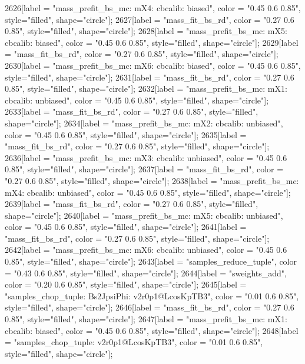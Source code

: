 {	2626[label = "mass_prefit_bs_mc\nmassbin: mX4\nmassmodel: cbcalib\ntrigger: biased", color = "0.45 0.6 0.85", style="filled", shape="circle"];
	2627[label = "mass_fit_bs_rd", color = "0.27 0.6 0.85", style="filled", shape="circle"];
	2628[label = "mass_prefit_bs_mc\nmassbin: mX5\nmassmodel: cbcalib\ntrigger: biased", color = "0.45 0.6 0.85", style="filled", shape="circle"];
	2629[label = "mass_fit_bs_rd", color = "0.27 0.6 0.85", style="filled", shape="circle"];
	2630[label = "mass_prefit_bs_mc\nmassbin: mX6\nmassmodel: cbcalib\ntrigger: biased", color = "0.45 0.6 0.85", style="filled", shape="circle"];
	2631[label = "mass_fit_bs_rd", color = "0.27 0.6 0.85", style="filled", shape="circle"];
	2632[label = "mass_prefit_bs_mc\nmassbin: mX1\nmassmodel: cbcalib\ntrigger: unbiased", color = "0.45 0.6 0.85", style="filled", shape="circle"];
	2633[label = "mass_fit_bs_rd", color = "0.27 0.6 0.85", style="filled", shape="circle"];
	2634[label = "mass_prefit_bs_mc\nmassbin: mX2\nmassmodel: cbcalib\ntrigger: unbiased", color = "0.45 0.6 0.85", style="filled", shape="circle"];
	2635[label = "mass_fit_bs_rd", color = "0.27 0.6 0.85", style="filled", shape="circle"];
	2636[label = "mass_prefit_bs_mc\nmassbin: mX3\nmassmodel: cbcalib\ntrigger: unbiased", color = "0.45 0.6 0.85", style="filled", shape="circle"];
	2637[label = "mass_fit_bs_rd", color = "0.27 0.6 0.85", style="filled", shape="circle"];
	2638[label = "mass_prefit_bs_mc\nmassbin: mX4\nmassmodel: cbcalib\ntrigger: unbiased", color = "0.45 0.6 0.85", style="filled", shape="circle"];
	2639[label = "mass_fit_bs_rd", color = "0.27 0.6 0.85", style="filled", shape="circle"];
	2640[label = "mass_prefit_bs_mc\nmassbin: mX5\nmassmodel: cbcalib\ntrigger: unbiased", color = "0.45 0.6 0.85", style="filled", shape="circle"];
	2641[label = "mass_fit_bs_rd", color = "0.27 0.6 0.85", style="filled", shape="circle"];
	2642[label = "mass_prefit_bs_mc\nmassbin: mX6\nmassmodel: cbcalib\ntrigger: unbiased", color = "0.45 0.6 0.85", style="filled", shape="circle"];
	2643[label = "samples_reduce_tuple", color = "0.43 0.6 0.85", style="filled", shape="circle"];
	2644[label = "sweights_add", color = "0.20 0.6 0.85", style="filled", shape="circle"];
	2645[label = "samples_chop_tuple\nmode: Bs2JpsiPhi\nversion: v2r0p1@LcosKpTB3", color = "0.01 0.6 0.85", style="filled", shape="circle"];
	2646[label = "mass_fit_bs_rd", color = "0.27 0.6 0.85", style="filled", shape="circle"];
	2647[label = "mass_prefit_bs_mc\nmassbin: mX1\nmassmodel: cbcalib\ntrigger: biased", color = "0.45 0.6 0.85", style="filled", shape="circle"];
	2648[label = "samples_chop_tuple\nversion: v2r0p1@LcosKpTB3", color = "0.01 0.6 0.85", style="filled", shape="circle"];
}

